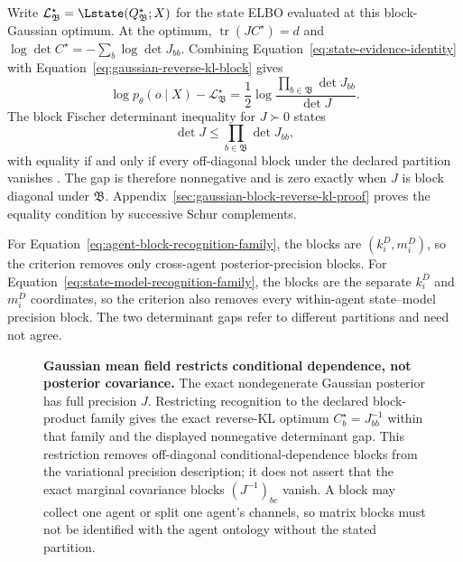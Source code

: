 Write \(\mathcal L_{\mathfrak B}^\star=\Lstate(Q_{\mathfrak B}^\star;X)\) for the state ELBO evaluated at this block-Gaussian optimum. At the optimum, \(\operatorname{tr}(JC^\star)=d\) and \(\log\det C^\star=-\sum_b\log\det J_{bb}\). Combining Equation~\eqref{eq:state-evidence-identity} with Equation~\eqref{eq:gaussian-reverse-kl-block} gives
\begin{equation}
\log p_\theta(o\mid X)-\mathcal L_{\mathfrak B}^\star
=\frac12\log
\frac{\displaystyle\prod_{b\in\mathfrak B}\det J_{bb}}
{\det J}.
\label{eq:gaussian-mean-field-evidence-gap}
\end{equation}
The block Fischer determinant inequality for \(J\succ0\) states
\begin{equation}
\det J\leq\prod_{b\in\mathfrak B}\det J_{bb},
\label{eq:block-fischer-determinant-inequality}
\end{equation}
with equality if and only if every off-diagonal block under the declared partition vanishes \citep{HornJohnson2013}. The gap is therefore nonnegative and is zero exactly when \(J\) is block diagonal under \(\mathfrak B\). Appendix~\ref{sec:gaussian-block-reverse-kl-proof} proves the equality condition by successive Schur complements.

For Equation~\eqref{eq:agent-block-recognition-family}, the blocks are \((k_i^D,m_i^D)\), so the criterion removes only cross-agent posterior-precision blocks. For Equation~\eqref{eq:state-model-recognition-family}, the blocks are the separate \(k_i^D\) and \(m_i^D\) coordinates, so the criterion also removes every within-agent state--model precision block. The two determinant gaps refer to different partitions and need not agree.

\begin{figure}[tbp]
\centering

\caption{\textbf{Gaussian mean field restricts conditional dependence, not posterior covariance.} The exact nondegenerate Gaussian posterior has full precision \(J\). Restricting recognition to the declared block-product family gives the exact reverse-KL optimum \(C_b^\star=J_{bb}^{-1}\) within that family and the displayed nonnegative determinant gap. This restriction removes off-diagonal conditional-dependence blocks from the variational precision description; it does not assert that the exact marginal covariance blocks \((J^{-1})_{bc}\) vanish. A block may collect one agent or split one agent's channels, so matrix blocks must not be identified with the agent ontology without the stated partition.}
\label{fig:magent-precision-mean-field}
\end{figure}

